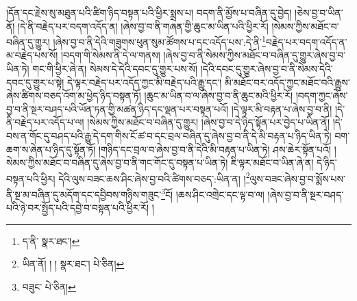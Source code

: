 །དོན་དང་རྗེས་སུ་མཐུན་པའི་ཚིག་ཉིད་བསྟན་པའི་ཕྱིར་སྨྲས་པ། བདག་ནི་མྱོས་པ་བཞིན་དུ་བྱེད། །ཅེས་བྱ་བ་ཡིན་ནོ། །དེ་ནི་བརྗེད་པར་བདག་འདོད་ན། །ཞེས་བྱ་བ་ནི་གཞན་གྱི་ཆུང་མ་ཡིན་པའི་ཕྱིར་རོ། །སེམས་ཀྱིས་མཐོང་བ་བཞིན་དུ་གྱུར། །ཞེས་བྱ་བ་ནི་དེའི་གཟུགས་ཕུན་སུམ་ཚོགས་པ་དང་འདོད་པས་:དེ་ནི་\footnote{ད་ནི་  སྣར་ཐང་། }བརྗེད་པར་བདག་འདོད་ན་མ་བརྗེད་པས་སོ། །བདག་གི་སེམས་ནི་དེ་ལ་གནས། །ཞེས་བྱ་བ་ནི་སེམས་ཀྱིས་མཐོང་བ་བཞིན་དུ་གྱུར་ཞེས་བྱ་བ་ཡིན་ཏེ། གང་གི་ཕྱིར་ཞེ་ན། སེམས་དེ་དེའི་དབང་དུ་གྱུར་པས་སོ། །དེའི་དབང་དུ་གྱུར་ཞེས་བྱ་བ་ནི་སེམས་དེའི་དབང་དུ་གྱུར་པ་སྟེ། དེ་ལྟར་བརྗེད་པར་འདོད་ཀྱང་མི་བརྗེད་པའི་རྒྱུ་དང་། མི་མཐོང་བར་འདོད་ཀྱང་མཐོང་བའི་རྒྱུས་ཞེས་ཚིགས་བཅད་འོག་མ་ཕྱེད་ཉིད་བསྟན་ཏོ། །ཆུང་མ་ཡིན་བ་ལ་ཞེས་བྱ་བ་ནི་ཆུང་མའི་ཕྱིར་རོ། །བདག་ཀྱང་ཞེས་བྱ་བ་ནི་སྔར་བཤད་པའི་ཡོན་ཏན་གྱི་མཚན་ཉིད་དང་ལྡན་པར་བསྟན་པའོ། །དེ་ལྟར་མི་བརྟན་པ་ཞེས་བྱ་བ་ནི། །དེ་ནི་བརྗེད་པར་འདོད་པ་ལ། །སེམས་ཀྱིས་མཐོང་བ་བཞིན་དུ་གྱུར། །ཞེས་བྱ་བ་དེ་ཉིད་སྟོན་པར་བྱེད་པ་ཡིན་ནོ། །དེ་བས་ན་གོང་དུ་བཤད་པའི་རྒྱུ་དེ་དག་གིས་ངོ་ཚ་བ་དང་བྲལ་བཞིན་དུ་ཞེས་བྱ་བ་ནི་དེ་མི་བརྟན་པ་ཉིད་ཡིན་ཏེ། བག་ཆག་ས་ཞེན་པ་ཉིད་དུ་སྟོན་ཏོ། །གཉིད་དང་བྲལ་བ་ཞེས་བྱ་བ་ནི་དེའི་མི་བརྟན་པ་ཡིན་ཏེ། ཤས་ཆེར་སྟོན་པའོ། །སེམས་ཀྱིས་མཐོང་བ་བཞིན་དུ་ཞེས་བྱ་བ་ནི་གང་གོང་དུ་བསྟན་པ་ཡིན་ཏེ། ཇི་ལྟར་མཐོང་བ་ཡིན་ཞེ་ན། དེ་ཉིད་བསྟན་པའི་ཕྱིར། དེའི་ལུས་བཟང་ཆས་ཤིང་ཞེས་བྱ་བའི་ཚིགས་བཅད་:ཡིན་ན། །\footnote{ཡིན་ནོ། ། །  སྣར་ཐང་།  པེ་ཅིན། }ལུས་བཟང་ཞེས་བྱ་བ་སྨོས་པས་ནི་སྔ་མ་བཞིན་དུ་མདོག་དང་དབྱིབས་གཉིས་གཟུང་\footnote{བཟུང་  པེ་ཅིན། }ངོ། །ཆས་ཤིང་འགྲེང་དང་ལྟ་བ་ལ། །ཞེས་བྱ་བ་ནི་སྔར་བཤད་པའི་ཉེ་བར་སྤྱོད་པའི་དབྱེ་བ་བསྟན་པའི་ཕྱིར་རོ། །
